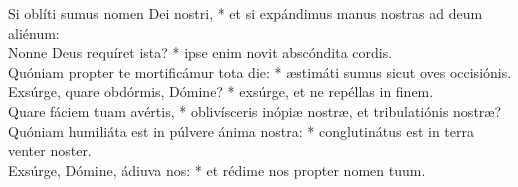 {	Si oblíti sumus nomen Dei nostri, * et si expándimus manus nostras ad deum aliénum: \\
	Nonne Deus requíret ista? * ipse enim novit abscóndita cordis. \\
	Quóniam propter te mortificámur tota die: * æstimáti sumus sicut oves occisiónis. \\
	Exsúrge, quare obdórmis, Dómine? * exsúrge, et ne repéllas in finem. \\
	Quare fáciem tuam avértis, * oblivísceris inópiæ nostræ, et tribulatiónis nostræ? \\
	Quóniam humiliáta est in púlvere ánima nostra: * conglutinátus est in terra venter noster. \\
	Exsúrge, Dómine, ádiuva nos: * et rédime nos propter nomen tuum. \\
}

